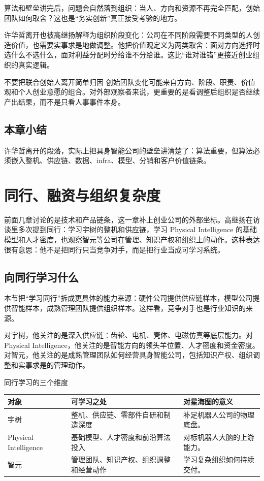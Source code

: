 \documentclass[a4paper]{article}
\begin{document}
算法和壁垒讲完后，问题会自然落到组织：当人、方向和资源不再完全匹配，创始团队如何取舍？这也是“务实创新”真正接受考验的地方。

许华哲离开也被高继扬解释为组织阶段变化：公司在不同阶段需要不同类型的人创造价值，也需要实事求是地做调整。他把价值观定义为两类取舍：面对方向选择时选什么不选什么，面对利益分配时分给谁不分给谁。这比“谁对谁错”更接近创业组织的真实逻辑。

\begin{warningbox}{不要把联合创始人离开简单归因}
创始团队变化可能来自方向、阶段、职责、价值观和个人创业意愿的组合。对外部观察者来说，更重要的是看调整后组织是否继续产出结果，而不是只看人事事件本身。
\end{warningbox}

\subsection{本章小结}

许华哲离开的段落，实际上把具身智能公司的壁垒讲清楚了：算法重要，但算法必须嵌入整机、供应链、数据、infra、模型、分销和客户价值链条。

\section{同行、融资与组织复杂度}

前面几章讨论的是技术和产品链条，这一章补上创业公司的外部坐标。高继扬在访谈里多次提到同行：学习宇树的整机和供应链，学习 Physical Intelligence 的基础模型和人才密度，也观察智元等公司在管理、知识产权和组织上的动作。这种表达很有意思：他不是把同行只当竞争对手，而是把行业当成可学习系统。

\subsection{向同行学习什么}

本节把“学习同行”拆成更具体的能力来源：硬件公司提供供应链样本，模型公司提供智能样本，成熟管理团队提供组织样本。这样看，竞争对手也是行业知识的来源。

对宇树，他关注的是深入供应链：齿轮、电机、壳体、电磁仿真等底层能力。对 Physical Intelligence，他关注的是智能方向的领头羊位置、人才密度和资金密度。对智元，他关注的是成熟管理团队如何经营具身智能公司，包括知识产权、组织调整和实事求是的管理动作。

\begin{knowledgebox}{同行学习的三个维度}
\begin{tabularx}{\textwidth}{p{}p{}X}
\toprule
对象 & 可学习之处 & 对星海图的意义 \\
\midrule
宇树 & 整机、供应链、零部件自研和制造深度 & 补足机器人公司的物理底盘。 \\
Physical Intelligence & 基础模型、人才密度和前沿算法投入 & 对标机器人大脑的上游能力。 \\
智元 & 管理团队、知识产权、组织调整和经营动作 & 学习复杂组织如何持续交付。 \\
\bottomrule
\end{tabularx}
\end{knowledgebox}
\end{document}
